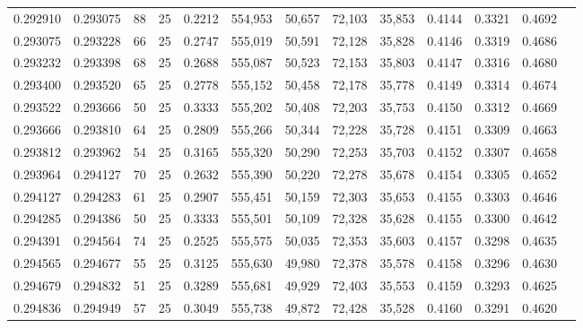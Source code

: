 \begin{tabular}{rrrrrrrrrrrrr}
0.292910 & 0.293075 &    88 &  25 &                                     0.2212 & 554,953 &  50,657 &  72,103 &  35,853 & 0.4144 & 0.3321 & 0.4692 \\
0.293075 & 0.293228 &    66 &  25 &                                     0.2747 & 555,019 &  50,591 &  72,128 &  35,828 & 0.4146 & 0.3319 & 0.4686 \\
0.293232 & 0.293398 &    68 &  25 &                                     0.2688 & 555,087 &  50,523 &  72,153 &  35,803 & 0.4147 & 0.3316 & 0.4680 \\
0.293400 & 0.293520 &    65 &  25 &                                     0.2778 & 555,152 &  50,458 &  72,178 &  35,778 & 0.4149 & 0.3314 & 0.4674 \\
0.293522 & 0.293666 &    50 &  25 &                                     0.3333 & 555,202 &  50,408 &  72,203 &  35,753 & 0.4150 & 0.3312 & 0.4669 \\
0.293666 & 0.293810 &    64 &  25 &                                     0.2809 & 555,266 &  50,344 &  72,228 &  35,728 & 0.4151 & 0.3309 & 0.4663 \\
0.293812 & 0.293962 &    54 &  25 &                                     0.3165 & 555,320 &  50,290 &  72,253 &  35,703 & 0.4152 & 0.3307 & 0.4658 \\
0.293964 & 0.294127 &    70 &  25 &                                     0.2632 & 555,390 &  50,220 &  72,278 &  35,678 & 0.4154 & 0.3305 & 0.4652 \\
0.294127 & 0.294283 &    61 &  25 &                                     0.2907 & 555,451 &  50,159 &  72,303 &  35,653 & 0.4155 & 0.3303 & 0.4646 \\
0.294285 & 0.294386 &    50 &  25 &                                     0.3333 & 555,501 &  50,109 &  72,328 &  35,628 & 0.4155 & 0.3300 & 0.4642 \\
0.294391 & 0.294564 &    74 &  25 &                                     0.2525 & 555,575 &  50,035 &  72,353 &  35,603 & 0.4157 & 0.3298 & 0.4635 \\
0.294565 & 0.294677 &    55 &  25 &                                     0.3125 & 555,630 &  49,980 &  72,378 &  35,578 & 0.4158 & 0.3296 & 0.4630 \\
0.294679 & 0.294832 &    51 &  25 &                                     0.3289 & 555,681 &  49,929 &  72,403 &  35,553 & 0.4159 & 0.3293 & 0.4625 \\
0.294836 & 0.294949 &    57 &  25 &                                     0.3049 & 555,738 &  49,872 &  72,428 &  35,528 & 0.4160 & 0.3291 & 0.4620 \\

\end{tabular}

